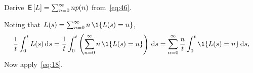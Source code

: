 \begin{exercise}\label{ex:l-111}
 Derive $\,\mathsf{E}\left[L\right] = \sum_{n=0}^\infty n p(n)$ from~\cref{eq:46}.
\begin{solution}
Noting that %
$L(s) = \sum_{n=0}^\infty n\, \1{\L(s) = n}$,
\begin{equation*}
\frac 1 t \int_0^t L(s) \d s = \frac 1 t \int_0^t \left(\sum_{n=0}^{\infty} n\, \1{\L(s) = n}\right) \d s
= \sum_{n=0}^{\infty} \frac n t \int_0^t \1{\L(s) = n} \d s,
\end{equation*}
Now apply~\cref{eq:18}.
\end{solution}
\end{exercise}







